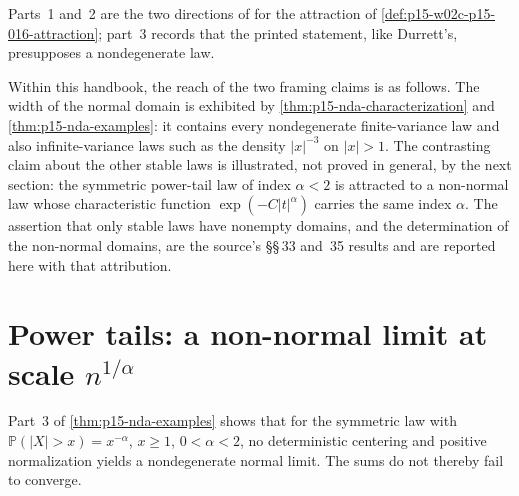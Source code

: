 Parts~1 and~2 are the two directions of
\cite[Section~35, Theorem~1, p.~172]{GnedenkoKolmogorov1954LimitDistributions}
for the attraction of \cref{def:p15-w02c-p15-016-attraction}; part~3
records that the printed statement, like Durrett's, presupposes a
nondegenerate law.

Within this handbook, the reach of the two framing claims is as
follows. The width of the normal domain is exhibited by
\cref{thm:p15-nda-characterization} and \cref{thm:p15-nda-examples}:
it contains every nondegenerate finite-variance law and also
infinite-variance laws such as the density \(|x|^{-3}\) on
\(|x|>1\). The contrasting claim about the other stable laws is
illustrated, not proved in general, by the next section: the
symmetric power-tail law of index \(\alpha<2\) is attracted to a
non-normal law whose characteristic function
\(\exp(-C|t|^\alpha)\) carries the same index \(\alpha\). The
assertion that only stable laws have nonempty domains, and the
determination of the non-normal domains, are the source's
\S\S\,33 and~35 results and are reported here with that attribution.

\section{Power tails: a non-normal limit at scale \texorpdfstring{\(n^{1/\alpha}\)}{n to the 1/alpha}}
\label{sec:p15-w02c-p15-016-power-tails}

Part~3 of \cref{thm:p15-nda-examples} shows that for the symmetric
law with \(\mathbb P(|X|>x)=x^{-\alpha}\), \(x\geq1\), \(0<\alpha<2\),
no deterministic centering and positive normalization yields a
nondegenerate normal limit. The sums do not thereby fail to converge.

